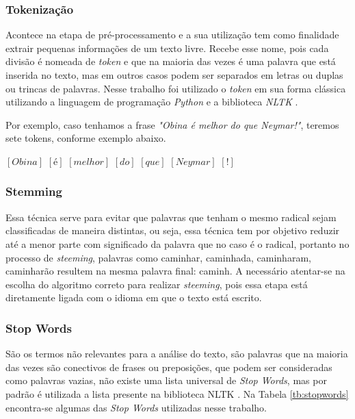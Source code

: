         \subsubsection{Tokenização}

              Acontece na etapa de pré-processamento e a sua utilização tem como finalidade extrair pequenas informações de um texto livre. Recebe esse nome, 
            pois cada divisão é nomeada de \textit{token} e que na maioria das vezes é uma palavra que está inserida no texto, mas em outros casos podem 
            ser separados em letras ou duplas ou trincas de palavras\cite{mcnamee2004character}. Nesse trabalho foi utilizado o \textit{token} em sua forma clássica utilizando 
            a linguagem de programação \textit{Python} e a biblioteca \textit{NLTK} \cite{bird2004nltk}.

              Por exemplo, caso tenhamos a frase \textit{"Obina é melhor do que Neymar!"}, teremos sete tokens, conforme exemplo abaixo.

                    $[Obina]$  $[é]$  $[melhor]$  $[do]$  $[que]$  $[Neymar]$  $[!]$
        \subsubsection{Stemming}

            Essa técnica serve para evitar que palavras que tenham o mesmo radical sejam classificadas de maneira distintas, ou seja, essa técnica tem
            por objetivo reduzir até a menor parte com significado da palavra que no caso é o radical, portanto no processo de \textit{steeming}, palavras
            como caminhar, caminhada, caminharam, caminharão resultem na mesma palavra final: caminh. A necessário atentar-se na escolha do algoritmo correto 
            para realizar \textit{steeming}, pois essa etapa está diretamente ligada com o idioma em que o texto está escrito.
        \subsubsection{Stop Words}

          São os termos não relevantes para a análise do texto, são palavras que na maioria das vezes são conectivos de frases ou preposições, que podem
          ser consideradas como palavras vazias, não existe uma lista universal de \textit{Stop Words}, mas por padrão é utilizada a lista presente na biblioteca
          NLTK \cite{bird2004nltk}. Na Tabela \ref{tb:stopwords} encontra-se algumas das \textit{Stop Words} utilizadas nesse trabalho.

